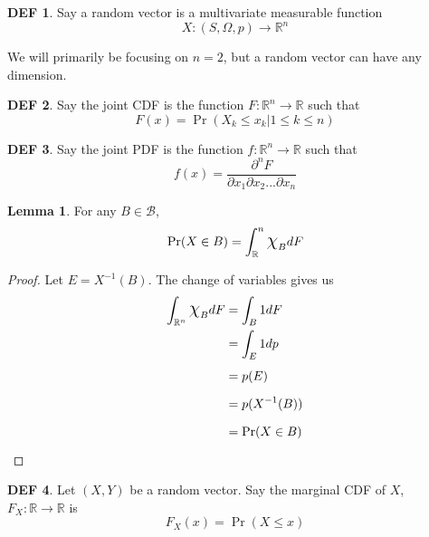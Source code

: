\documentclass{article}
\theoremstyle{definition}\newtheorem{definition}{DEF}
\theoremstyle{lemma}\newtheorem{lemma}{Lemma}
\theoremstyle{corrolary}\newtheorem{corrolary}{Cor}
\begin{document}
\begin{definition}
Say a random vector is a multivariate measurable function
\begin{equation}
X: (S, \Omega, p) \rightarrow \mathbb{R}^n
\end{equation}
\end{definition}

We will primarily be focusing on $n=2$, but a random vector can have any dimension.

\begin{definition}
Say the joint CDF is the function $F: \mathbb{R}^n \rightarrow \mathbb{R}$ such that
\begin{equation}
F(x)=\Pr(X_k \leq x_k | 1 \leq k \leq n)
\end{equation}
\end{definition}

\begin{definition}
Say the joint PDF is the function $f: \mathbb{R}^n \rightarrow \mathbb{R}$ such that
\begin{equation}
f(x)=\frac{\partial^n F}{\partial x_1 \partial x_2 ... \partial x_n}
\end{equation}
\end{definition}

\begin{lemma}
For any $B \in \mathcal{B}$,
\begin{equation}
\Pr(X \in B)=\int_\mathbb{R}^n \mbox{\Large$\chi$}_B dF
\end{equation}
\end{lemma}
\begin{proof}
Let $E=X^{-1}(B)$.
The change of variables gives us 
\begin{align*}
\int_{\mathbb{R}^n} \mbox{\Large$\chi$}_B dF &= \int_B 1dF\\
&= \int_E 1dp\\
&= p(E) \\
&= p(X^{-1}(B)) \\
&= \Pr(X \in B)
\end{align*}
\end{proof}

\begin{definition}
Let $(X,Y)$ be a random vector. Say the marginal CDF of $X$, $F_X: \mathbb{R} \rightarrow \mathbb{R}$ is
\begin{equation}
F_X (x) = \Pr(X \leq x)
\end{equation}
\end{definition}
\end{document}
